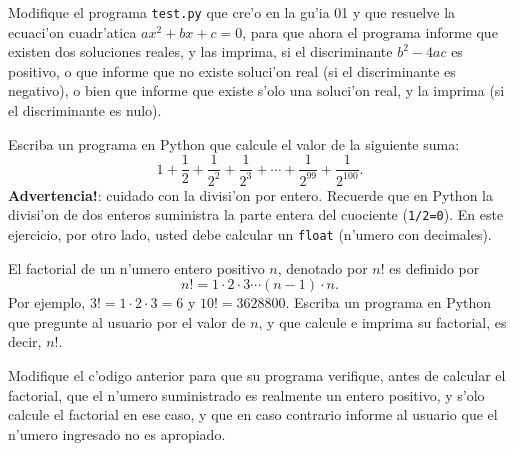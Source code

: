 \documentclass[11pt]{exam}
\begin{document}
\firstpageheadrule
\runningheadrule
{}
\cfoot{ }
\begin{flushleft}
\vspace{0.2in}
\vspace{0.25cm}
\end{flushleft}

\begin{questions}

\item Modifique el programa \texttt{test.py} que cre'o en la gu'ia 01 y que resuelve la ecuaci'on cuadr'atica $ax^2+bx+c=0$, para que ahora el programa informe que existen dos soluciones reales, y las imprima, si el discriminante $b^2-4ac$ es positivo, o que informe que no existe soluci'on real (si el discriminante es negativo), o bien que informe que existe s'olo una soluci'on real, y la imprima (si el discriminante es nulo).
\item Escriba un programa en Python que calcule el valor de la siguiente suma:
\begin{equation}
1+\frac{1}{2}+\frac{1}{2^2}+\frac{1}{2^3}+\cdots+\frac{1}{2^{99}}+\frac{1}{2^{100}}.
\end{equation}
\textbf{Advertencia!}: cuidado con la divisi'on por entero. Recuerde que en Python la divisi'on de dos enteros suministra la parte entera del cuociente (\texttt{1/2=0}). En este ejercicio, por otro lado, usted debe calcular un \texttt{float} (n'umero con decimales).

\item El factorial de un n'umero entero positivo $n$, denotado por $n!$ es definido por
\begin{equation}
n!=1\cdot 2\cdot 3\cdots (n-1)\cdot n.
\end{equation}
Por ejemplo, $3!=1\cdot 2\cdot 3=6$ y $10!=3628800$.
Escriba un programa en Python que pregunte al usuario por el valor de $n$, y que calcule e imprima su factorial, es decir, $n!$.
\item Modifique el c'odigo anterior para que su programa verifique, antes de calcular el factorial, que el n'umero suministrado es realmente un entero positivo, y s'olo calcule el factorial en ese caso, y que en caso contrario informe al usuario que el n'umero ingresado no es apropiado.


\end{questions}
\end{document}
